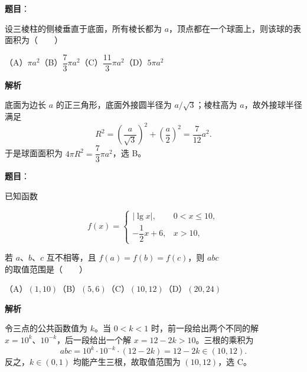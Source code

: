 \begin{answer}

\textbf{题目}：

设三棱柱的侧棱垂直于底面，所有棱长都为 $a$，顶点都在一个球面上，则该球的表面积为\mbox{（　　）}

（A）$\pi a^2$\quad（B）$\dfrac73\pi a^2$\quad（C）$\dfrac{11}3\pi a^2$\quad（D）$5\pi a^2$

\textbf{解析}

底面为边长 $a$ 的正三角形，底面外接圆半径为 $a/\sqrt3$；棱柱高为 $a$，故外接球半径满足
\nopagebreak[4]
\[
R^2=\left(\frac a{\sqrt3}\right)^2+\left(\frac a2\right)^2=\frac7{12}a^2.
\]
于是球面面积为 $4\pi R^2=\dfrac73\pi a^2$，选 B。


\end{answer}
\begin{answer}

\textbf{题目}：

已知函数

\nopagebreak[4]
\[
f(x)=\begin{cases}
|\lg x|,&0<x\leq10,\\
-\dfrac12x+6,&x>10,
\end{cases}
\]

若 $a\text{、}b\text{、}c$ 互不相等，且 $f(a)=f(b)=f(c)$，则 $abc$ 的取值范围是\mbox{（　　）}

（A）$(1,10)$\quad（B）$(5,6)$\quad（C）$(10,12)$\quad（D）$(20,24)$

\textbf{解析}

令三点的公共函数值为 $k$。当 $0<k<1$ 时，前一段给出两个不同的解
$x=10^k\text{、}10^{-k}$，后一段给出一个解 $x=12-2k>10$。三根的乘积为
\nopagebreak[4]
\[
abc=10^k\cdot10^{-k}\cdot(12-2k)=12-2k\in(10,12).
\]
反之，$k\in(0,1)$ 均能产生三根，故取值范围为 $(10,12)$，选 C。


\end{answer}
